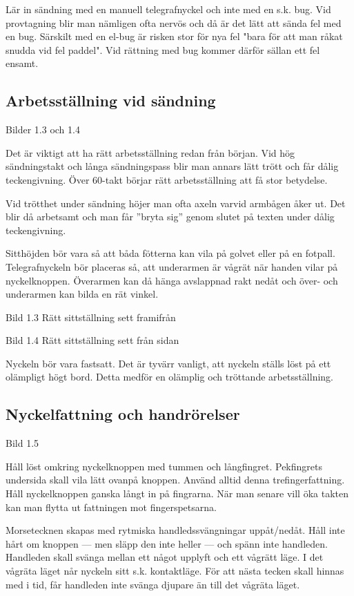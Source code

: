 Lär in sändning med en manuell telegrafnyckel och inte med en s.k. bug. Vid
provtagning blir man nämligen ofta nervös och då är det lätt att sända fel med
en bug. Särskilt med en el-bug är risken stor för nya fel "bara för att man
råkat snudda vid fel paddel".  Vid rättning med bug kommer därför sällan ett fel
ensamt.

\subsection{Arbetsställning vid sändning}

Bilder 1.3 och 1.4

Det är viktigt att ha rätt arbetsställning redan från början. Vid hög
sändningstakt och långa sändningspass blir man annars lätt trött och får dålig
teckengivning.  Över 60-takt börjar rätt arbetsställning att få stor betydelse.

Vid trötthet under sändning höjer man ofta axeln varvid armbågen åker ut. Det
blir då arbetsamt och man får ''bryta sig'' genom slutet på texten under dålig
teckengivning.

Sitthöjden bör vara så att båda fötterna kan vila på golvet eller på en fotpall.
Telegrafnyckeln bör placeras så, att underarmen är vågrät när handen vilar på
nyckelknoppen. Överarmen kan då hänga avslappnad rakt nedåt och över- och
underarmen kan bilda en rät vinkel.

Bild 1.3 Rätt sittställning sett framifrån

Bild 1.4 Rätt sittställning sett från sidan

Nyckeln bör vara fastsatt. Det är tyvärr vanligt, att nyckeln ställs löst på ett
olämpligt högt bord. Detta medför en olämplig och tröttande arbetsställning.

\subsection{Nyckelfattning och handrörelser}

Bild 1.5

Håll löst omkring nyckelknoppen med tummen och långfingret. Pekfingrets
undersida skall vila lätt ovanpå knoppen. Använd alltid denna
trefingerfattning. Håll nyckelknoppen ganska långt in på fingrarna. När man
senare vill öka takten kan man flytta ut fattningen mot fingerspetsarna.

Morsetecknen skapas med rytmiska handledssvängningar uppåt/nedåt. Håll inte hårt
om knoppen --- men släpp den inte heller --- och spänn inte handleden. Handleden
skall svänga mellan ett något upplyft och ett vågrätt läge. I det vågräta läget
når nyckeln sitt s.k. kontaktläge. För att nästa tecken skall hinnas med i tid,
får handleden inte svänga djupare än till det vågräta läget.

